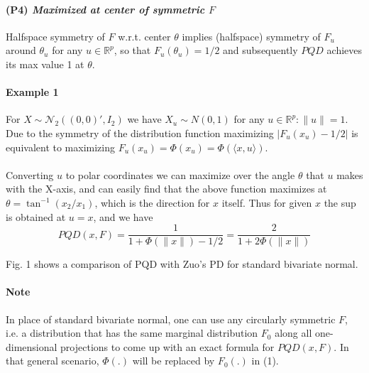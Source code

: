 \documentclass{article}
\begin{document}
\paragraph{(P4) \textit{Maximized at center of symmetric $F$}} Halfspace symmetry of $F$ w.r.t. center $\theta$ implies (halfspace) symmetry of $F_u$ around $\theta_u$ for any $u\in\mathbb{R}^p$, so that $F_u(\theta_u)=1/2$ and subsequently $PQD$ achieves its max value 1 at $\theta$.

\paragraph{Example 1}For $X\sim \mathcal{N}_2((0,0)',I_2)$ we have $X_u\sim N(0,1)$ for any $u\in\mathbb{R}^p: \|u\|=1$. Due to the symmetry of the distribution function maximizing $|F_u(x_u)-1/2|$ is equivalent to maximizing $F_u(x_u)=\Phi(x_u) = \Phi(\langle x,u\rangle)$.

\paragraph{} Converting $u$ to polar coordinates we can maximize over the angle $\theta$ that $u$ makes with the X-axis, and can easily find that the above function maximizes at $\theta = \tan^{-1}(x_2/x_1)$, which is the direction for $x$ itself. Thus for given $x$ the sup is obtained at $u=x$, and we have
\begin{equation}
PQD(x,F) = \frac{1}{1+\Phi(\|x\|)-1/2} = \frac{2}{1+2\Phi(\|x\|)}
\end{equation}

Fig. 1 shows a comparison of PQD with Zuo's PD for standard bivariate normal.
\paragraph{Note} In place of standard bivariate normal, one can use any circularly symmetric $F$, i.e. a distribution that has the same marginal distribution $F_0$ along all one-dimensional projections to come up with an exact formula for $PQD(x,F)$. In that general scenario, $\Phi(.)$ will be replaced by $F_0(.)$ in (1).
\end{document}
